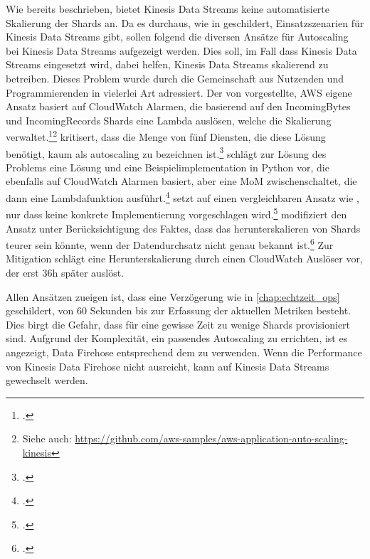 Wie bereits beschrieben, bietet Kinesis Data Streams keine automatisierte Skalierung der Shards an. Da es durchaus, wie in  geschildert, Einsatzszenarien für Kinesis Data Streams gibt, sollen folgend die diversen Ansätze für Autoscaling bei Kinesis Data Streams aufgezeigt werden. Dies soll, im Fall dass Kinesis Data Streams eingesetzt wird, dabei helfen, Kinesis Data Streams skalierend zu betreiben. Dieses Problem wurde durch die Gemeinschaft aus Nutzenden und Programmierenden in vielerlei Art adressiert. 
Der von \citeauthor{AmazonWebServices.2018} vorgestellte, \ac{AWS} eigene Ansatz basiert auf CloudWatch Alarmen, die basierend auf den IncomingBytes und IncomingRecords Shards eine Lambda auslösen, welche die Skalierung verwaltet.\footcite[Vgl.][]{AmazonWebServices.2018}\nzitat\footnote{Siehe auch: \url{https://github.com/aws-samples/aws-application-auto-scaling-kinesis}} 
\citeauthor{Pogosova.28.05.2020} kritisert, dass die Menge von fünf Diensten, die diese Lösung benötigt, kaum als autoscaling zu bezeichnen ist.\footcite[Vgl.][]{Pogosova.28.05.2020} 
\citeauthor{Stanley.2019} schlägt zur Lösung des Problems eine Lösung und eine Beispielimplementation in Python vor, die ebenfalls auf CloudWatch Alarmen basiert, aber eine \ac{MoM} zwischenschaltet, die dann eine Lambdafunktion ausführt.\footcite[Vgl.][]{Stanley.2019} 
\citeauthor{Prasath.2019} setzt auf einen vergleichbaren Ansatz wie \citeauthor{Stanley.2019}, nur dass keine konkrete Implementierung vorgeschlagen wird.\footcite[Vgl.][]{Prasath.2019} 
\citeauthor{Cui.2017} modifiziert den Ansatz unter Berücksichtigung des Faktes, dass das herunterskalieren von Shards teurer sein könnte, wenn der Datendurchsatz nicht genau bekannt ist.\footcite[Vgl. auch im Folgendn][]{Cui.2017} Zur Mitigation schlägt \citeauthor{Cui.2017} eine Herunterskalierung durch einen CloudWatch Auslöser vor, der erst 36h später auslöst. 

Allen Ansätzen zueigen ist, dass eine Verzögerung wie in \autoref{chap:echtzeit_ops} geschildert, von 60 Sekunden bis zur Erfassung der aktuellen Metriken besteht. Dies birgt die Gefahr, dass für eine gewisse Zeit zu wenige Shards provisioniert sind. Aufgrund der Komplexität, ein passendes Autoscaling zu errichten, ist es angezeigt, Data Firehose entsprechend dem  zu verwenden. Wenn die Performance von Kinesis Data Firehose nicht ausreicht, kann auf Kinesis Data Streams gewechselt werden.

